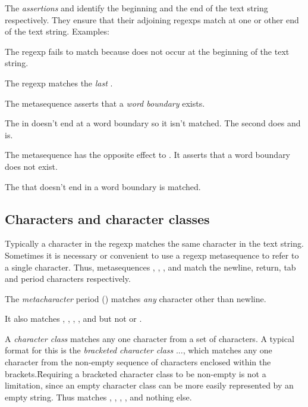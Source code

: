 {The {\em assertions} \p{^} and \p{$} identify the
beginning and the end of the text string respectively.
They ensure that their adjoining regexps match at
one or other end of the text string.
Examples:


\n The regexp fails to match because  does not
occur at the beginning of the text string.


\n The regexp matches the {\em last} .

The metasequence \p{\b} asserts that
a {\em word boundary} exists.


\n The  in  doesn't end at a word
boundary so it isn't matched.  The second  does
and is.

The metasequence \p{\B} has the opposite effect
to \p{\b}.   It asserts that a word boundary
does not exist.


\n The  that doesn't end in a word boundary
is matched.

\subsection{Characters and character classes}

Typically a character in the regexp matches the same
character in the text string.  Sometimes it is
necessary or convenient to use a regexp
metasequence to refer to a single character.
Thus, metasequences \p{\n}, \p{\r}, \p{\t}, and \p{\.}
match the newline, return, tab and period characters
respectively.

The {\em metacharacter} period () matches
{\em any} character other than newline.


\n It also matches , , , ,
and  but not  or .

A {\em character class} matches any one character from
a set of characters.  A typical format for this
is the {\em bracketed character class} \p{[}...\p{]},
which matches any one character from the non-empty sequence
of characters enclosed within the brackets.\f{Requiring
a bracketed character class to be non-empty is not a limitation,
since an
empty character class
can be more easily represented by an empty string.}
Thus  matches , , ,
,  and nothing else.

}
